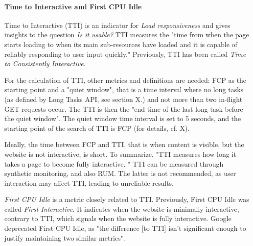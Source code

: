 

\paragraph{Time to Interactive and First CPU Idle}


Time to Interactive (TTI) is an indicator for \textit{Load responsiveness} and gives insights to the question \textit{Is it usable?}
TTI measures the "time from when the page starts loading to when its main sub-resources have loaded and it is capable of reliably responding to user input quickly."
Previously, TTI has been called \textit{Time to Consistently Interactive}. %

For the calculation of TTI, other metrics and definitions are needed:
FCP as the starting point and a "quiet window", that is a time interval where no long tasks (as defined by Long Tasks API, see section X.) and not more than two in-flight GET requests occur. %
The TTI is then the "end time of the last long task before the quiet window".
The quiet window time interval is set to 5 seconds, and the starting point of the search of TTI is FCP (for details, cf. X).

Ideally, the time between FCP and TTI, that is when content is visible, but the website is not interactive, is short.
To summarize, "TTI measures how long it takes a page to become fully interactive. " %
TTI can be measured through synthetic monitoring, and also RUM.
The latter is not recommended, as user interaction may affect TTI, leading to unreliable results.



\textit{First CPU Idle} is a metric closely related to TTI.
Previously, First CPU Idle was called \textit{First Interactive}. %
It indicates when the website is minimally interactive, contrary to TTI, which signals when the website is fully interactive.
Google deprecated First CPU Idle, as "the difference [to TTI] isn't significant enough to justify maintaining two similar metrics". %


